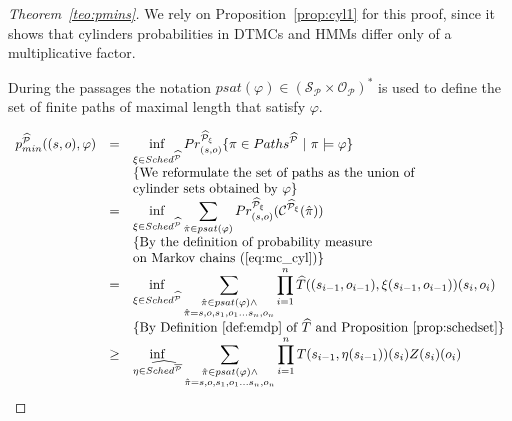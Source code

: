 \begin{proof}[Theorem~\ref{teo:pmins}]


We rely on Proposition~\ref{prop:cyl1} for this proof, since it shows that cylinders probabilities in \acp{DTMC} and \acp{HMM} differ only of a multiplicative factor.

During the passages the notation $psat(\varphi) \in (\mathcal{S}_{\mathcal{P}}\times\mathcal{O}_\mathcal{P})^*$ is used to define the set of finite paths of maximal length that satisfy $\varphi$.

$$
\begin{array}{lll}
	p^{\widehat{\mathcal{P}}}_{min}((s,o),\varphi) &=& \displaystyle \inf_{\xi \in Sched^{\widehat{\mathcal{P}}}} Pr_{(s,o)}^{\widehat{\mathcal{P}}_{\xi}}\{\pi \in Paths^{\widehat{\mathcal{P}}}\ |\ \pi \models \varphi\} \\
	&& \{ \text{We reformulate the set of paths as the union of} \\
	&& \text{cylinder sets obtained by } \varphi \} \\
	&=& \displaystyle \inf_{\xi \in Sched^{\widehat{\mathcal{P}}}} \sum_{\hat\pi \in psat(\varphi)} Pr_{(s,o)}^{\widehat{\mathcal{P}}_{\xi}}(\mathcal{C}^{\widehat{\mathcal{P}}_{\xi}}(\hat\pi)) \\
	&& \{\text{By the definition of probability measure} \\
	&& \text{on Markov chains (\ref{eq:mc_cyl})}\} \\
	&=& \displaystyle \inf_{\xi \in Sched^{\widehat{\mathcal{P}}}} \sum_{\substack{\hat\pi \in psat(\varphi) \wedge \\ \hat\pi = s,o,s_1,o_1\dots s_n,o_n }} \prod_{i=1}^n \widehat{T}((s_{i-1},o_{i-1}),\xi(s_{i-1},o_{i-1}))(s_i,o_i) \\
	&& \{\text{By Definition~\ref{def:emdp} of $\widehat{T}$ and Proposition~\ref{prop:schedset}}\} \\
	&\geq& \displaystyle \inf_{\eta \in \widehat{Sched^{\mathcal{\overline{P}}}}} \sum_{\substack{\hat\pi \in psat(\varphi) \wedge \\ \hat\pi = s,o,s_1,o_1\dots s_n,o_n}} \prod_{i=1}^n T(s_{i-1},\eta(s_{i-1}))(s_i) Z(s_i)(o_i) \\
\end{array}
$$


\end{proof}
